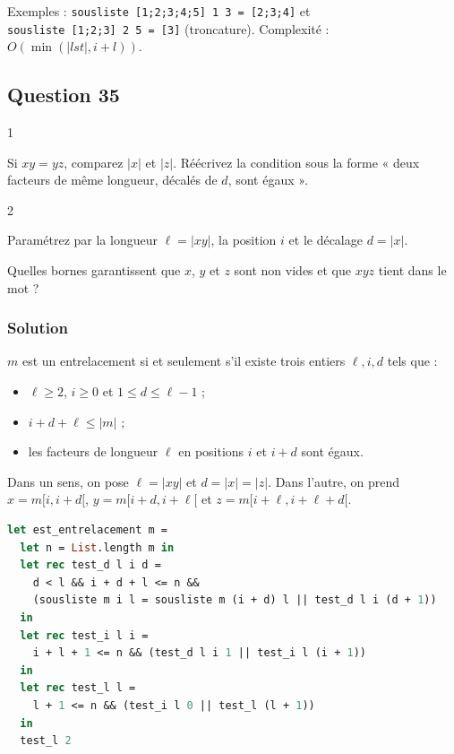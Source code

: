 \documentclass[11pt,a4paper]{article}
\providecommand{\tightlist}{\setlength{\itemsep}{0pt}\setlength{\parskip}{0pt}}
\begin{document}
Exemples : \texttt{sousliste\ {[}1;\allowbreak{}2;\allowbreak{}3;\allowbreak{}4;\allowbreak{}5{]}\allowbreak{}\ 1\ 3\ =\allowbreak{}\ {[}2;\allowbreak{}3;\allowbreak{}4{]}\allowbreak{}} et \texttt{sousliste\ {[}1;\allowbreak{}2;\allowbreak{}3{]}\allowbreak{}\ 2\ 5\ =\allowbreak{}\ {[}3{]}\allowbreak{}} (troncature). Complexité : \(O(\min(|lst|,i+l))\).

\hypertarget{question-35}{%
\subsection{Question 35}\label{question-35}}

\begin{indication}{1}

Si \(xy=yz\), comparez \(|x|\) et \(|z|\). Réécrivez la condition sous la forme « deux facteurs de même longueur, décalés de \(d\), sont égaux ».

\end{indication}

\begin{indication}{2}

Paramétrez par la longueur \(\ell=|xy|\), la position \(i\) et le décalage \(d=|x|\).

Quelles bornes garantissent que \(x\), \(y\) et \(z\) sont non vides et que \(xyz\) tient dans le mot ?

\end{indication}

\hypertarget{solution-34}{%
\subsubsection{Solution}\label{solution-34}}

\(m\) est un entrelacement si et seulement s'il existe trois entiers \(\ell,i,d\) tels que :

\begin{itemize}
\tightlist
\item
  \(\ell\ge 2\), \(i\ge 0\) et \(1\le d\le\ell-1\) ;
\item
  \(i+d+\ell\le|m|\) ;
\item
  les facteurs de longueur \(\ell\) en positions \(i\) et \(i+d\) sont égaux.
\end{itemize}

Dans un sens, on pose \(\ell=|xy|\) et \(d=|x|=|z|\). Dans l'autre, on prend \(x=m[i,i+d[\), \(y=m[i+d,i+\ell[\) et \(z=m[i+\ell,i+\ell+d[\).

\begin{lstlisting}[language=Caml]
let est_entrelacement m =
  let n = List.length m in
  let rec test_d l i d =
    d < l && i + d + l <= n &&
    (sousliste m i l = sousliste m (i + d) l || test_d l i (d + 1))
  in
  let rec test_i l i =
    i + l + 1 <= n && (test_d l i 1 || test_i l (i + 1))
  in
  let rec test_l l =
    l + 1 <= n && (test_i l 0 || test_l (l + 1))
  in
  test_l 2
\end{lstlisting}
\end{document}
